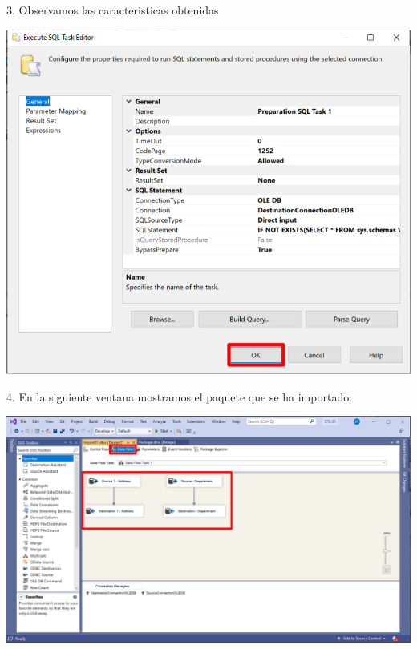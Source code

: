 \documentclass[12pt,letterpaper]{article}
\begin{document}
3. Observamos las caracteristicas obtenidas
	\begin{center}
	\includegraphics[width=14cm]{./img/18}
	\end{center}	
4. En la siguiente ventana mostramos el paquete que se ha importado.
	\begin{center}
	\includegraphics[width=17cm]{./img/19}
	\end{center}
	
\end{document}
